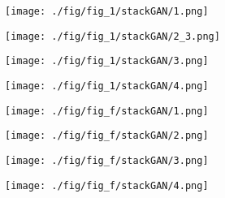 \documentclass{article}
\begin{document}
\begin{figure*}[t!h]
		\begin{minipage}[c]{0.01\textwidth}
		\end{minipage}
		\hfill
		\begin{minipage}{0.115\textwidth}
			\texttt{[image: ./fig/fig\_1/stackGAN/1.png]}
		\end{minipage}
		\hfill
		\begin{minipage}{0.115\textwidth}
			\texttt{[image: ./fig/fig\_1/stackGAN/2\_3.png]}
		\end{minipage}
		\hfill
		\begin{minipage}{0.115\textwidth}
			\texttt{[image: ./fig/fig\_1/stackGAN/3.png]}
		\end{minipage}
		\hfill
		\begin{minipage}{0.115\textwidth}
			\texttt{[image: ./fig/fig\_1/stackGAN/4.png]}
		\end{minipage}
\hspace{1pt}
		\begin{minipage}{0.115\textwidth}
			\texttt{[image: ./fig/fig\_f/stackGAN/1.png]}
		\end{minipage}
		\hfill
		\begin{minipage}{0.115\textwidth}
			\texttt{[image: ./fig/fig\_f/stackGAN/2.png]}
		\end{minipage}
		\hfill
		\begin{minipage}{0.115\textwidth}
			\texttt{[image: ./fig/fig\_f/stackGAN/3.png]}
		\end{minipage}
		\hfill
		\begin{minipage}{0.115\textwidth}
			\texttt{[image: ./fig/fig\_f/stackGAN/4.png]}
		\end{minipage}
		\vspace{2pt}
		

\end{figure*}
\end{document}
